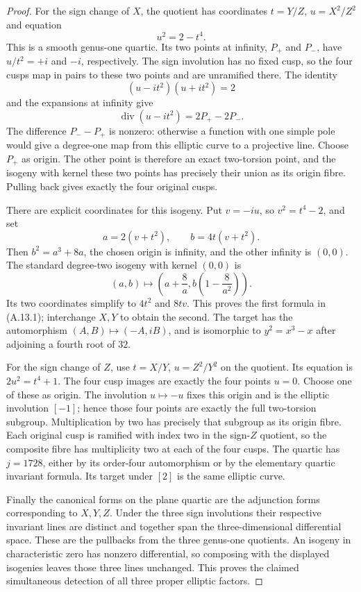 \begin{proof}
For the sign change of $X$, the quotient has coordinates
$t=Y/Z$, $u=X^2/Z^2$ and equation
\[
                         u^2=2-t^4.
\]
This is a smooth genus-one quartic. Its two points at infinity,
$P_+$ and $P_-$, have $u/t^2=+i$ and $-i$, respectively.
The sign involution has no fixed cusp, so the four cusps map
in pairs to these two points and are unramified there.
The identity
\[
                   (u-it^2)(u+it^2)=2
\]
and the expansions at infinity give
\[
             \operatorname{div}(u-it^2)=2P_+-2P_-.
\]
The difference $P_--P_+$ is nonzero: otherwise a function with
one simple pole would give a degree-one map from this elliptic
curve to a projective line. Choose $P_+$ as origin. The other
point is therefore an exact two-torsion point, and the isogeny
with kernel these two points has precisely their union as its
origin fibre. Pulling back gives exactly the four original cusps.

There are explicit coordinates for this isogeny. Put
$v=-iu$, so $v^2=t^4-2$, and set
\[
       a=2(v+t^2),\qquad b=4t(v+t^2).
\]
Then $b^2=a^3+8a$, the chosen origin is infinity, and the other
infinity is $(0,0)$. The standard degree-two isogeny with kernel
$(0,0)$ is
\[
              (a,b)\longmapsto
                   \left(a+\frac8a,b\left(1-\frac8{a^2}\right)\right).
\]
Its two coordinates simplify to $4t^2$ and $8tv$.
This proves the first formula in (A.13.1); interchange $X,Y$ to
obtain the second. The target has the automorphism
$(A,B)\mapsto(-A,iB)$, and is isomorphic to $y^2=x^3-x$
after adjoining a fourth root of $32$.

For the sign change of $Z$, use $t=X/Y$, $u=Z^2/Y^2$ on
the quotient. Its equation is $2u^2=t^4+1$. The four cusp
images are exactly the four points $u=0$. Choose one of these
as origin. The involution $u\mapsto-u$ fixes this origin and
is the elliptic involution $[-1]$; hence those four points are
exactly the full two-torsion subgroup. Multiplication by two
has precisely that subgroup as its origin fibre. Each original
cusp is ramified with index two in the sign-$Z$ quotient, so the
composite fibre has multiplicity two at each of the four cusps.
The quartic has $j=1728$, either by its order-four automorphism
or by the elementary quartic invariant formula. Its target under
$[2]$ is the same elliptic curve.

Finally the canonical forms on the plane quartic are the
adjunction forms corresponding to $X,Y,Z$. Under the three
sign involutions their respective invariant lines are distinct
and together span the three-dimensional differential space.
These are the pullbacks from the three genus-one quotients.
An isogeny in characteristic zero has nonzero differential,
so composing with the displayed isogenies leaves those three
lines unchanged. This proves the claimed simultaneous detection
of all three proper elliptic factors.


\end{proof}
